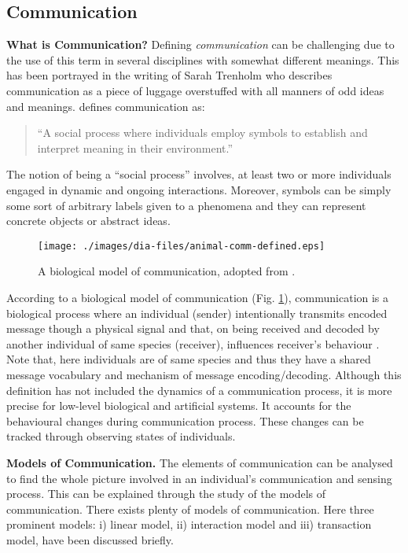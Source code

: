 \subsection{Communication} 
\label{bg:def:comm}
\textbf{What is Communication?} Defining {\em communication} can be challenging due to the use of this term in several disciplines with somewhat different meanings. This has been portrayed in the writing of Sarah Trenholm \cite{West+2003} who describes communication as a piece of luggage overstuffed with all manners of odd ideas and meanings.  defines communication  as:
\begin{quote}
\ssp
``A social process where individuals employ symbols to establish and interpret meaning in their environment.''
\end{quote}
\sdp
 The notion of being a ``social process'' involves, at least two or more individuals engaged in dynamic and ongoing interactions. Moreover, symbols can be simply some sort of arbitrary labels given to a phenomena and they can represent  concrete objects or  abstract ideas.
\begin{figure}[H]
\centering
\texttt{[image: ./images/dia-files/animal-comm-defined.eps]}
\caption{ A biological model of communication, adopted from \protect{}.}
\label{fig:bio-comm-defined} 
\end{figure}

According to a biological model of communication (Fig. \ref{fig:bio-comm-defined}), communication is a biological process where an  individual (sender) intentionally transmits encoded message though a physical signal and that, on being received and decoded by another individual of same species (receiver), influences receiver's behaviour \cite{Frings1997}. Note that, here individuals are of same species and thus they have a  shared message vocabulary and mechanism of message encoding/decoding. Although  this definition has not included the dynamics of a communication process, it is more precise for low-level biological and artificial systems. It accounts for the behavioural changes during communication process. These changes can be tracked through observing states of individuals.

\textbf{Models of Communication.} The elements of communication can be analysed to find the whole picture involved in an individual's communication and sensing process. This can be explained through the study of the models  of communication. There exists plenty of models of communication. Here three prominent models: i) linear model, ii) interaction model and iii) transaction model, have been discussed briefly.

